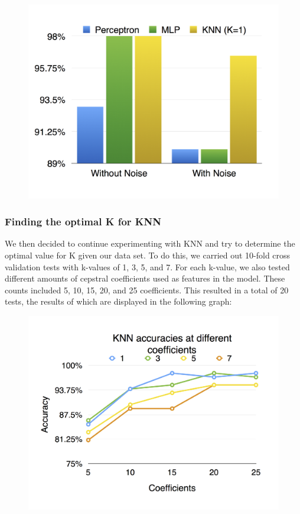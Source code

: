 \documentclass{article}
\begin{document}
\begin{figure}[H]
\includegraphics[width=\linewidth]{WithNoise_comparison}
\end{figure}

\subsubsection{Finding the optimal K for KNN}

We then decided to continue experimenting with KNN and try to determine the optimal value for K given our data set.  To do this, we carried out 10-fold cross validation tests with k-values of 1, 3, 5, and 7.  For each k-value, we also tested different amounts of cepstral coefficients used as features in the model.  These counts included 5, 10, 15, 20, and 25 coefficients.  This resulted in a total of 20 tests, the results of which are displayed in the following graph:

\begin{figure}[H]
\includegraphics[width=\linewidth]{KNN_accuracies_with_different_coeff}
\end{figure}
\end{document}
